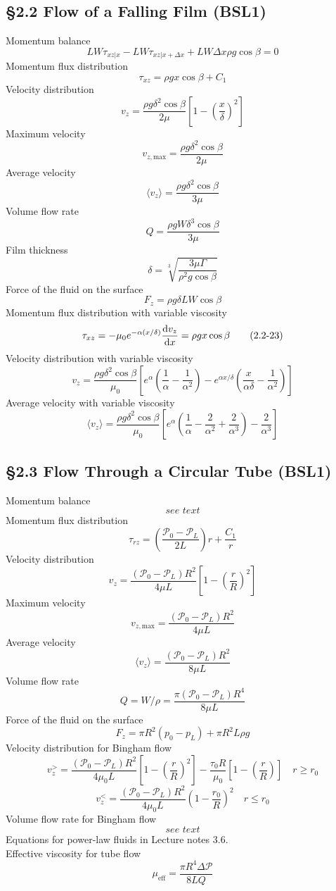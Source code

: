 \subsection{\S2.2 Flow of a Falling Film (BSL1)}
Momentum balance
\[
	LW\tau_{xz|x}-LW\tau_{xz|x+\Delta x}+LW\Delta x\rho g\cos\beta=0\tag{2.2-6}
\]
Momentum flux distribution%
\[
	\tau_{xz}=\rho gx\cos\beta+C_1\tag{2.2-9}
\]
Velocity distribution%
\[
	v_z=\frac{\rho g\delta^2\cos\beta}{2\mu}\left[1-\left(\frac{x}{\delta}\right)^2\right]\tag{2.2-16}
\]
Maximum velocity
\[
	v_{z,\text{max}}=\frac{\rho g\delta^2\cos\beta}{2\mu}\tag{2.2-17}
\]
Average velocity
\[
	\langle v_z\rangle=\frac{\rho g\delta^2\cos\beta}{3\mu}\tag{2.2-18}
\]
Volume flow rate
\[
	Q=\frac{\rho gW\delta^3\cos\beta}{3\mu}\tag{2.2-19}
\]
Film thickness
\[
	\delta=\sqrt[3]{\frac{3\mu\Gamma}{\rho^2 g\cos\beta}}\tag{2.2-20}
\]
Force of the fluid on the surface
\[
	F_z=\rho g\delta LW\cos\beta\tag{2.2-21}
\]
Momentum flux distribution with variable viscosity
\[
	\tau_{xz}=-\mu_0e^{-\alpha(x/\delta)}\frac{\mathop{}\!\mathrm{d} v_z}{\mathop{}\!\mathrm{d} x}=\rho gx\cos\beta\tag{2.2-23}
\]
Velocity distribution with variable viscosity
\[
	v_z=\frac{\rho g\delta^2\cos\beta}{\mu_0}\left[e^\alpha\left(\frac{1}{\alpha}-\frac{1}{\alpha^2}\right)-e^{\alpha x/\delta}\left(\frac{x}{\alpha\delta}-\frac{1}{\alpha^2}\right)\right]\tag{2.2-24}
\]
Average velocity with variable viscosity
\[
	\langle v_z\rangle=\frac{\rho g\delta^2\cos\beta}{\mu_0}\left[e^\alpha\left(\frac{1}{\alpha}-\frac{2}{\alpha^2}+\frac{2}{\alpha^3}\right)-\frac{2}{\alpha^3}\right]\tag{2.2-26}
\]
\subsection{\S2.3 Flow Through a Circular Tube (BSL1)}
Momentum balance
\[
	\textit{see text}\tag{2.3-8}
\]
Momentum flux distribution
\[
	\tau_{rz}=\left(\frac{\mathscr{P}_0-\mathscr{P}_L}{2L}\right)r+\frac{C_1}{r}\tag{2.3-11}
\]
Velocity distribution
\[
	v_z=\frac{(\mathscr{P}_0-\mathscr{P}_L)R^2}{4\mu L}\left[1-\left(\frac{r}{R}\right)^2\right]\tag{2.3-16}
\]
Maximum velocity
\[
	v_{z,\text{max}}=\frac{(\mathscr{P}_0-\mathscr{P}_L)R^2}{4\mu L}\tag{2.3-17}
\]
Average velocity
\[
	\langle v_z\rangle=\frac{(\mathscr{P}_0-\mathscr{P}_L)R^2}{8\mu L}\tag{2.3-18}
\]
Volume flow rate
\[
	Q=W/\rho=\frac{\pi(\mathscr{P}_0-\mathscr{P}_L)R^4}{8\mu L}\tag{2.3-19}
\]
Force of the fluid on the surface
\[
	F_z=\pi R^2(p_0-p_L)+\pi R^2L\rho g\tag{2.3-20}
\]
Velocity distribution for Bingham flow
\[
	v_z^>=\frac{(\mathscr{P}_0-\mathscr{P}_L)R^2}{4\mu_0 L}\left[1-\left(\frac{r}{R}\right)^2\right]-\frac{\tau_0 R}{\mu_0}\left[1-\left(\frac{r}{R}\right)\right] \quad r\geq r_0\tag{2.3-25}
\]
\[
	v_z^<=\frac{(\mathscr{P}_0-\mathscr{P}_L)R^2}{4\mu_0 L}\left(1-\frac{r_0}{R}\right)^2\quad r\leq r_0\tag{2.3-26}
\]
Volume flow rate for Bingham flow
\[
	\textit{see text}\tag{2.3-30}
\]
Equations for power-law fluids in Lecture notes 3.6.\\
Effective viscosity for tube flow
\[
\mu_{\text{eff}}=\frac{\pi R^4\Delta\mathscr{P}}{8LQ}\tag{Lecture notes 3.8}
\]
